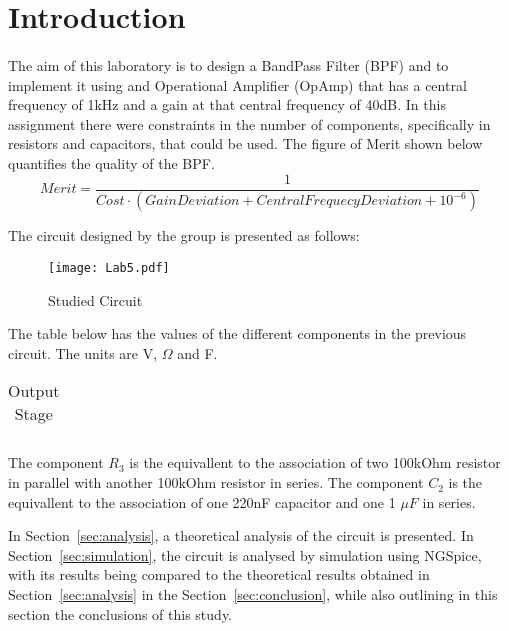 \section{Introduction}
\label{sec:introduction}
\paragraph{}
\par The aim of this laboratory is to design a BandPass Filter (BPF) and to implement it using and Operational Amplifier (OpAmp) that has a central frequency of 1kHz and a gain at that central frequency of 40dB. In this assignment there were constraints in the number of components, specifically in resistors and capacitors, that could be used. The figure of Merit shown below quantifies the quality of the BPF.
\[Merit=\frac{1}{Cost \cdot (GainDeviation + CentralFrequecyDeviation + 10^{-6})}\]

\par The circuit designed by the group is presented as follows:

\begin{figure}[H]
    \texttt{[image: Lab5.pdf]}
    \centering
    \caption{Studied Circuit}
    \label{circuit}
\end{figure}

\par The table below has the values of the different components in the previous circuit. The units are V, $\Omega$ and F.            	

\begin{table}[H]
    \centering
    \begin{tabular}{|c|c|}
    \hline
        
    \end{tabular}
    \caption{Output Stage}
    \label{table4a}
\end{table}


\par The component $R_3$ is the equivallent to the association of two 100kOhm resistor in parallel with another 100kOhm resistor in series. The component $C_2$ is the equivallent to the association of one 220nF capacitor and one 1 $\mu F$ in series. 

\par In Section~\ref{sec:analysis}, a theoretical analysis of the circuit is
presented. In Section~\ref{sec:simulation}, the circuit is analysed by
simulation using NGSpice, with its results being compared to the theoretical results obtained in
Section~\ref{sec:analysis} in the Section~\ref{sec:conclusion}, while also outlining in this section the conclusions of this study.	

